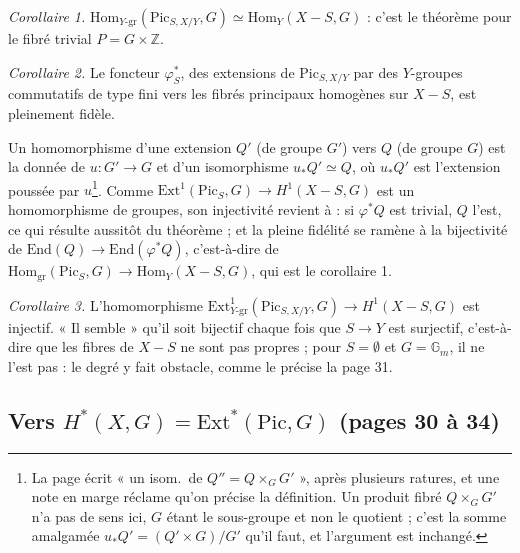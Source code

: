 \documentclass[11pt,a4paper]{article}
\begin{document}
\emph{Corollaire 1.} $\mathrm{Hom}_{Y\text{-gr}}(\mathrm{Pic}_{S,X/Y}, G) \simeq
\mathrm{Hom}_Y(X - S, G)$ : c'est le théorème pour le fibré trivial $P = G \times
\mathbb{Z}$.

\emph{Corollaire 2.} Le foncteur $\varphi_S^{*}$, des extensions de
$\mathrm{Pic}_{S,X/Y}$ par des $Y$-groupes commutatifs de type fini vers les
fibrés principaux homogènes sur $X - S$, est pleinement fidèle.

Un homomorphisme d'une extension $Q'$ (de groupe $G'$) vers $Q$ (de groupe $G$)
est la donnée de $u : G' \to G$ et d'un isomorphisme $u_*Q' \simeq Q$, où
$u_*Q'$ est l'extension poussée par $u$\footnote{La page écrit « un isom.\ de
$Q'' = Q \times_G G'$ », après plusieurs ratures, et une note en marge réclame
qu'on précise la définition. Un produit fibré $Q \times_G G'$ n'a pas de sens ici,
$G$ étant le sous-groupe et non le quotient ; c'est la somme amalgamée $u_*Q' =
(Q' \times G)/G'$ qu'il faut, et l'argument est inchangé.}. Comme
$\mathrm{Ext}^1(\mathrm{Pic}_S, G) \to H^1(X - S, G)$ est un homomorphisme de
groupes, son injectivité revient à : si $\varphi^{*}Q$ est trivial, $Q$ l'est, ce
qui résulte aussitôt du théorème ; et la pleine fidélité se ramène à la
bijectivité de $\mathrm{End}(Q) \to \mathrm{End}(\varphi^{*}Q)$, c'est-à-dire de
$\mathrm{Hom}_{\text{gr}}(\mathrm{Pic}_S, G) \to \mathrm{Hom}_Y(X - S, G)$, qui est
le corollaire 1.

\emph{Corollaire 3.} L'homomorphisme
$\mathrm{Ext}^1_{Y\text{-gr}}(\mathrm{Pic}_{S,X/Y}, G) \to H^1(X - S, G)$ est
injectif. « Il semble » qu'il soit bijectif chaque fois que $S \to Y$ est
surjectif, c'est-à-dire que les fibres de $X - S$ ne sont pas propres ; pour
$S = \emptyset$ et $G = \mathbb{G}_m$, il ne l'est pas : le degré y fait
obstacle, comme le précise la page 31.

\subsection*{Vers $H^*(X, G) = \mathrm{Ext}^*(\mathrm{Pic}, G)$ (pages 30 à 34)}
\end{document}
